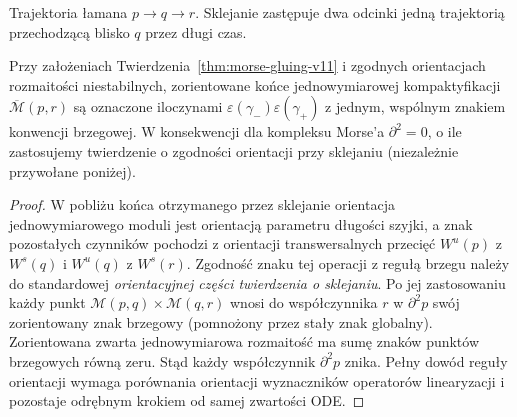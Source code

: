 \begin{center}
\par\smallskip\small Trajektoria łamana $p\to q\to r$.
Sklejanie zastępuje dwa odcinki jedną trajektorią
przechodzącą blisko $q$ przez długi czas.
\end{center}

\begin{stwierdzenie}
\label{prop:morse-d2-analytic-v11}
Przy założeniach Twierdzenia~\ref{thm:morse-gluing-v11}
i zgodnych orientacjach rozmaitości niestabilnych,
zorientowane końce jednowymiarowej kompaktyfikacji
$\overline{\mathcal M}(p,r)$ są oznaczone iloczynami
$\varepsilon(\gamma_-)\varepsilon(\gamma_+)$
z jednym, wspólnym znakiem konwencji brzegowej.
W konsekwencji dla kompleksu Morse'a $\partial^2=0$,
o ile zastosujemy twierdzenie o zgodności orientacji
przy sklejaniu (niezależnie przywołane poniżej).
\end{stwierdzenie}
\begin{proof}
W pobliżu końca otrzymanego przez sklejanie orientacja jednowymiarowego
moduli jest orientacją parametru długości szyjki,
a znak pozostałych czynników pochodzi z orientacji
transwersalnych przecięć $W^u(p)$ z $W^s(q)$ i
$W^u(q)$ z $W^s(r)$.
Zgodność znaku tej operacji z regułą brzegu należy do
standardowej \emph{orientacyjnej części twierdzenia
o sklejaniu}. Po jej zastosowaniu każdy punkt
\(\mathcal M(p,q)\times\mathcal M(q,r)\)
wnosi do współczynnika $r$ w $\partial^2p$ swój
zorientowany znak brzegowy (pomnożony przez stały
znak globalny). Zorientowana zwarta
jednowymiarowa rozmaitość ma sumę znaków punktów
brzegowych równą zeru. Stąd każdy współczynnik
$\partial^2p$ znika. Pełny dowód reguły orientacji
wymaga porównania orientacji wyznaczników operatorów
linearyzacji i pozostaje odrębnym krokiem od
samej zwartości ODE.
\end{proof}

